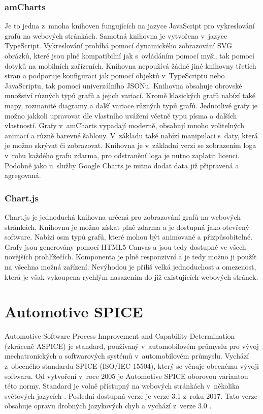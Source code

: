 \documentclass[czech,master]{diploma}
\begin{document}
\subsection{amCharts}
\label{sec:amcharts}
Je to jedna z~mnoha knihoven fungujících na jazyce JavaScript pro vykreslování grafů na webových stránkách. Samotná knihovna je vytvořena v~jazyce TypeScript. Vykreslování probíhá pomocí dynamického zobrazování SVG obrázků, které jsou plně kompatibilní jak s~ovládáním pomocí myši, tak pomocí dotyků na mobilních zařízeních. Knihovna nepoužívá žádné jiné knihovny třetích stran a podporuje konfiguraci jak pomocí objektů v~TypeScriptu nebo JavaScriptu, tak pomocí univerzálního JSONu. Knihovna obsahuje obrovské množství různých typů grafů a jejich variací. Kromě klasických grafů nabízí také mapy, rozmanité diagramy a další variace různých typů grafů. Jednotlivé grafy je možno jakkoli upravovat dle vlastního uvážení včetně typu písma a dalších vlastností. Grafy v~amCharts vypadají moderně, obsahují mnoho volitelných animací a různě barevné šablony.  V~základu také nabízí manipulaci s~daty, která je možno skrývat či zobrazovat. Knihovna je v~základní verzi se zobrazením loga v~rohu každého grafu zdarma, pro odstranění loga je nutno zaplatit licenci. Podobně jako u~služby Google Charts je nutno dodat data již připravená a agregovaná. \cite{ref:amcharts_web}

\subsection{Chart.js}
\label{sec:chartjs}
Chart.js je jednoduchá knihovna určená pro zobrazování grafů na webových stránkách. Knihovnu je možno získat plně zdarma a je dostupná jako otevřený software. Nabízí osm typů grafů, které mohou být animované a přizpůsobitelné. Grafy jsou generovány pomocí HTML5 Canvas a jsou tedy dostupné ve všech novějších prohlížečích. Komponenta je plně responzivní a je tedy možno ji použít na všechna možná zařízení. Nevýhodou je příliš velká jednoduchost a omezenost, která je však vykoupena rychlým nasazením do již existujících webových stránek. \cite{ref:chartjs}



\chapter{Automotive SPICE}
\label{sec:aspice}
Automotive Software Process Improvement and Capability Determination (zkráceně ASPICE) je standard, používaný v~automobilovém průmyslu pro vývoj mechatronických a softwarových systémů v~automobilovém průmyslu. Vychází z~obecného standardu SPICE (ISO/IEC 15504), který se věnuje obecnému vývoji softwaru. Od vytvoření v~roce 2005 je Automotive SPICE oborovou variantou této normy. Standard je volně přístupný na webových stránkách v~několika světových jazycích \cite{ref:aspice_download_obecne}. Poslední dostupná verze je verze 3.1 z~roku 2017. Tato verze obsahuje opravu drobných jazykových chyb a vychází z~verze 3.0 \cite{ref:aspice_download_verze}.
\end{document}
